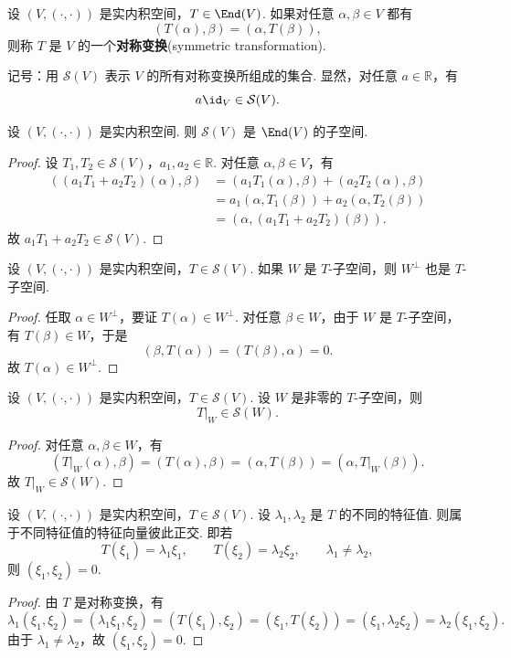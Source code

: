 \begin{definition}
	设 $(V,(\cdot,\cdot))$ 是实内积空间，$T\in\End(V)$. 如果对任意 $\alpha,\beta\in V$ 都有
	\[
	(T(\alpha),\beta)=(\alpha,T(\beta)),
	\]
	则称 $T$ 是 $V$ 的一个\textbf{对称变换}(symmetric transformation).
\end{definition}

记号：用 $\mathcal{S}(V)$ 表示 $V$ 的所有对称变换所组成的集合. 显然，对任意 $a\in\mathbb{R}$，有
\[
a\id_V\in\mathcal{S}(V).
\]

\begin{lemma}
	设 $(V,(\cdot,\cdot))$ 是实内积空间. 则 $\mathcal{S}(V)$ 是 $\End(V)$ 的子空间.
\end{lemma}
\begin{proof}
	设 $T_1,T_2\in\mathcal{S}(V)$，$a_1,a_2\in\mathbb{R}$. 对任意 $\alpha,\beta\in V$，有
	\[
	\begin{aligned}
		((a_1T_1+a_2T_2)(\alpha),\beta)
		&=(a_1T_1(\alpha),\beta)+(a_2T_2(\alpha),\beta)\\
		&=a_1(\alpha,T_1(\beta))+a_2(\alpha,T_2(\beta))\\
		&=(\alpha,(a_1T_1+a_2T_2)(\beta)).
	\end{aligned}
	\]
	故 $a_1T_1+a_2T_2\in\mathcal{S}(V)$.
\end{proof}

\begin{lemma}
	设 $(V,(\cdot,\cdot))$ 是实内积空间，$T\in\mathcal{S}(V)$. 如果 $W$ 是 $T$-子空间，则 $W^\perp$ 也是 $T$-子空间.
\end{lemma}
\begin{proof}
	任取 $\alpha\in W^\perp$，要证 $T(\alpha)\in W^\perp$. 对任意 $\beta\in W$，由于 $W$ 是 $T$-子空间，有 $T(\beta)\in W$，于是
	\[
	(\beta,T(\alpha))=(T(\beta),\alpha)=0.
	\]
	故 $T(\alpha)\in W^\perp$.
\end{proof}

\begin{example}
	设 $(V,(\cdot,\cdot))$ 是实内积空间，$T\in\mathcal{S}(V)$. 设 $W$ 是非零的 $T$-子空间，则
	\[
	T|_W\in\mathcal{S}(W).
	\]
\end{example}
\begin{proof}
	对任意 $\alpha,\beta\in W$，有
	\[
	(T|_W(\alpha),\beta)=(T(\alpha),\beta)=(\alpha,T(\beta))=(\alpha,T|_W(\beta)).
	\]
	故 $T|_W\in\mathcal{S}(W)$.
\end{proof}

\begin{lemma}
	设 $(V,(\cdot,\cdot))$ 是实内积空间，$T\in\mathcal{S}(V)$. 设 $\lambda_1,\lambda_2$ 是 $T$ 的不同的特征值. 则属于不同特征值的特征向量彼此正交. 即若
	\[
	T(\xi_1)=\lambda_1\xi_1,
	\qquad
	T(\xi_2)=\lambda_2\xi_2,
	\qquad
	\lambda_1\ne\lambda_2,
	\]
	则 $(\xi_1,\xi_2)=0$.
\end{lemma}
\begin{proof}
	由 $T$ 是对称变换，有
	\[
	\lambda_1(\xi_1,\xi_2)=(\lambda_1\xi_1,\xi_2)=(T(\xi_1),\xi_2)=(\xi_1,T(\xi_2))=(\xi_1,\lambda_2\xi_2)=\lambda_2(\xi_1,\xi_2).
	\]
	由于 $\lambda_1\ne\lambda_2$，故 $(\xi_1,\xi_2)=0$.
\end{proof}



